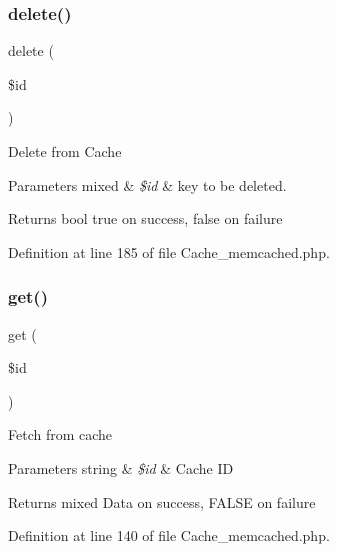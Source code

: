 \subsubsection{\texorpdfstring{delete()}{delete()}}
{\footnotesize\ttfamily delete (\begin{DoxyParamCaption}\item[{}]{\$id }\end{DoxyParamCaption})}

Delete from Cache


\begin{DoxyParams}[1]{Parameters}
mixed & {\em \$id} & key to be deleted. \\
\hline
\end{DoxyParams}
\begin{DoxyReturn}{Returns}
bool true on success, false on failure 
\end{DoxyReturn}


Definition at line 185 of file Cache\+\_\+memcached.\+php.

\mbox{\label{class_c_i___cache__memcached_a50e3bfb586b2f42932a6a93f3fbb0828}} 
\subsubsection{\texorpdfstring{get()}{get()}}
{\footnotesize\ttfamily get (\begin{DoxyParamCaption}\item[{}]{\$id }\end{DoxyParamCaption})}

Fetch from cache


\begin{DoxyParams}[1]{Parameters}
string & {\em \$id} & Cache ID \\
\hline
\end{DoxyParams}
\begin{DoxyReturn}{Returns}
mixed Data on success, F\+A\+L\+SE on failure 
\end{DoxyReturn}


Definition at line 140 of file Cache\+\_\+memcached.\+php.

\mbox{\label{class_c_i___cache__memcached_a59635cf18e997c5141bffa05ff7622e0}} 
